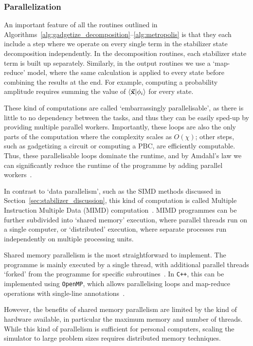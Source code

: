 \subsubsection{Parallelization}
An important feature of all the routines outlined in Algorithms~\ref{alg:gadgetize_decomposition}--\ref{alg:metropolis} is that they each include a step where we operate on every single term in the stabilizer state decomposition independently. In the decomposition routines, each stabilizer state term is built up separately. Similarly, in the output routines we use a `map-reduce' model, where the same calculation is applied to every state before combining the results at the end. For example, computing a probability amplitude requires summing the value of $\braket{\va{x}}{\phi_{i}}$ for every state.\par
These kind of computations are called `embarrassingly parallelisable', as there is little to no dependency between the tasks, and thus they can be easily sped-up by providing multiple parallel workers. Importantly, these loops are also the only parts of the computation where the complexity scales as $O(\chi)$; other steps, such as gadgetizing a circuit or computing a PBC, are efficiently computable. Thus, these parallelisable loops dominate the runtime, and by Amdahl's law we can significantly reduce the runtime of the programme by adding parallel workers~\cite{Amdahl1967}.\par
In contrast to `data parallelism', such as the SIMD methods discussed in Section~\ref{sec:stabilizer_discussion}, this kind of computation is called Multiple Instruction Multiple Data (MIMD) computation~\cite{Flynn1972}. MIMD programmes can be further subdivided into `shared memory' execution, where parallel threads run on a single computer, or `distributed' execution, where separate processes run independently on multiple processing units.\par
Shared memory parallelism is the most straightforward to implement. The programme is mainly executed by a single thread, with additional parallel threads `forked' from the programme for specific subroutines~\cite{Kessler2007}. In \texttt{C++}, this can be implemented using \texttt{OpenMP}, which allows parallelising loops and map-reduce operations with single-line annotations~\cite{OpenMP}.\par
However, the benefits of shared memory parallelism are limited by the kind of hardware available, in particular the maximum memory and number of threads. While this kind of parallelism is sufficient for personal computers, scaling the simulator to large problem sizes requires distributed memory techniques.\par
